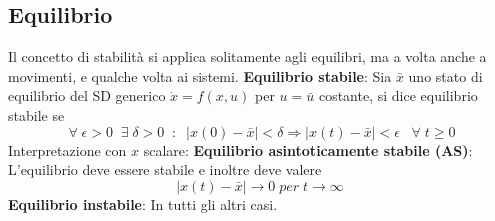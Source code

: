 \subsection{Equilibrio}
Il concetto di stabilità si applica solitamente agli equilibri, ma a volta anche a movimenti, e qualche volta ai sistemi.\newline
\newline
\textbf{Equilibrio stabile}:\newline
Sia $\bar{x}$ uno stato di equilibrio del SD generico $\dot{x} = f(x,u)$ per $u = \bar{u}$ costante, si dice equilibrio stabile se
\[
    \;\forall\; \epsilon > 0 \;\; \exists \; \delta > 0 \;\;:\;\; |x(0) - \bar{x}| < \delta \Rightarrow  |x(t) - \bar{x}| < \epsilon \;\;\;\forall\;t \geq 0
\]
Interpretazione con $x$ scalare:\newline
\newline
\textbf{Equilibrio asintoticamente stabile (AS)}:\newline
L'equilibrio deve essere stabile e inoltre deve valere
\[
    |x(t) - \bar{x}| \rightarrow 0  \;per \; t \rightarrow \infty
\]
\newline
\textbf{Equilibrio instabile}:\newline
In tutti gli altri casi.
